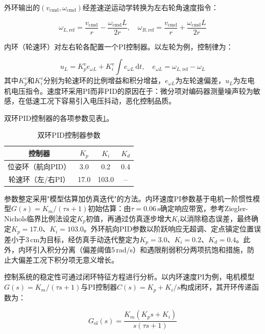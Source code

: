 {{    外环输出的$(v_{\mathrm{cmd}}, \omega_{\mathrm{cmd}})$经差速逆运动学转换为左右轮角速度指令：

    \begin{equation}
    \omega_{L,\mathrm{ref}} = \frac{v_{\mathrm{cmd}}}{r} - \frac{\omega_{\mathrm{cmd}}L}{2r},\quad
    \omega_{R,\mathrm{ref}} = \frac{v_{\mathrm{cmd}}}{r} + \frac{\omega_{\mathrm{cmd}}L}{2r}
    \label{eq:inverse_kinematics_ctrl}
    \end{equation}

    内环（轮速环）对左右轮各配置一个PI控制器。以左轮为例，控制律为：

    \begin{equation}
    u_L = K_p^v e_{\omega L} + K_i^v \int e_{\omega L}\,\mathrm{d}t,\quad e_{\omega L} = \omega_{L,\mathrm{ref}} - \omega_L
    \label{eq:wheel_pi}
    \end{equation}
    其中$K_p^v$和$K_i^v$分别为轮速环的比例增益和积分增益，$e_{\omega L}$为左轮速偏差，$u_L$为左电机电压指令。速度环采用PI而非PID的原因在于：微分项对编码器测量噪声较为敏感，在低速工况下容易引入电压抖动，恶化控制品质。

    双环PID控制器的各项参数见表\ref{tab:pid_params}。
    \begin{table}[htbp]
    \wuhao
    \centering
    \caption{双环PID控制器参数}
    \label{tab:pid_params}
    \begin{tabular}{cccc}
    \toprule
    控制器 & $K_p$ & $K_i$ & $K_d$ \\
    \midrule
    位姿环（航向PID） & 3.0 & 0.2 & 0.4 \\
    轮速环（左/右PI） & 17.0 & 103.0 & -- \\
    \bottomrule
    \end{tabular}
    \end{table}

    参数整定采用"模型估算加仿真迭代"的方法。内环速度PI参数基于电机一阶惯性模型$G(s)=K_m/(\tau s+1)$初始估算：由$\tau=0.06\,\mathrm{s}$确定响应带宽，参考Ziegler-Nichols临界比例法设定$K_p$初值，再通过仿真逐步增大$K_i$以消除稳态误差，最终确定$K_p=17.0$、$K_i=103.0$。外环航向PID参数以阶跃响应无超调、定点镇定位置误差小于3\,cm为目标，经仿真手动迭代整定为$K_p=3.0$、$K_i=0.2$、$K_d=0.4$。此外，内环引入积分分离（偏差阈值5\,rad/s）和遇限削弱积分两项抗饱和措施，防止大偏差工况下积分项无意义增长。

    控制系统的稳定性可通过闭环特征方程进行分析。以内环速度PI为例，电机模型$G(s)=K_m/(\tau s+1)$与PI控制器$C(s)=K_p+K_i/s$构成闭环，其开环传递函数为：

    \begin{equation}
    G_{\text{ol}}(s) = \frac{K_m(K_p s + K_i)}{s(\tau s + 1)}
    \label{eq:open_loop}
    \end{equation}

}}
